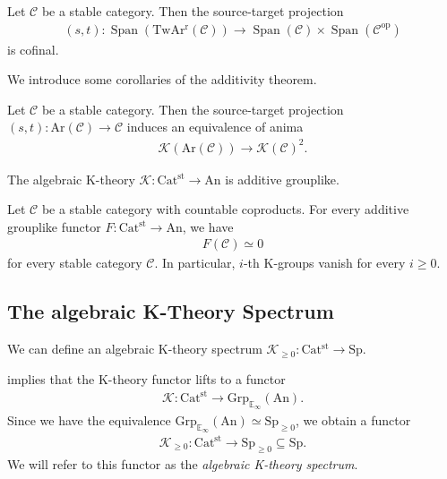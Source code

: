 \documentclass[a4paper,dvipdfmx,11pt,reqno]{amsart}
\DeclareMathOperator{\myop}{op}
\DeclareMathOperator{\Span}{Span}
\newcommand{\C}{\mathcal{C}}
\newcommand{\K}{\mathcal{K}}
\newcommand{\An}{\mathrm{An}}
\newcommand{\Catst}{\mathrm{Cat^{st}}}
\newcommand{\Grp}{\mathrm{Grp}_{\mathbb{E}_{\infty}}}
\newcommand{\Ar}{\mathrm{Ar}}
\newcommand{\TwArr}{\mathrm{TwAr^{r}}}
\newcommand{\Sp}{\mathrm{Sp}}
\begin{document}
\begin{proposition}
  Let $\C$ be a stable category.
  Then the source-target projection 
  \begin{align*}
    (s,t) : \Span(\TwArr(\C)) \to \Span(\C) \times \Span(\C^{\myop})
  \end{align*}
  is cofinal.
\end{proposition}

We introduce some corollaries of the additivity theorem.

\begin{corollary}
  Let $\C$ be a stable category.
  Then the source-target projection $(s,t) : \Ar(\C) \to \C $ induces an equivalence of anima
  \begin{align*}
    \K(\Ar(\C)) \to \K(\C)^2.
  \end{align*}
\end{corollary}

\begin{corollary} \label{cor.algebraic_k-theory_is_additive_grouplike}
  The algebraic K-theory $\K : \Catst \to \An$ is additive grouplike.
\end{corollary}

\begin{proposition}
  Let $\C$ be a stable category with countable coproducts.
  For every additive grouplike functor $F : \Catst \to \An$, we have 
  \begin{align*}
    F(\C) \simeq 0
  \end{align*}
  for every stable category $\C$.
  In particular, $i$-th K-groups vanish for every $i \geq 0$.
\end{proposition}

\subsection{The algebraic K-Theory Spectrum}

We can define an algebraic K-theory spectrum $\K_{\geq 0} : \Catst \to \Sp$.

\begin{definition}
   implies that the K-theory functor lifts to a functor 
  \begin{align*}
    \K : \Catst \to \Grp(\An).
  \end{align*}
  Since we have the equivalence $\Grp(\An) \simeq \Sp_{\geq 0}$, we obtain a functor 
  \begin{align*}
    \K_{\geq 0} : \Catst \to \Sp_{\geq 0} \subseteq \Sp.
  \end{align*}
  We will refer to this functor as the \textit{algebraic K-theory spectrum}.
\end{definition}
\end{document}
